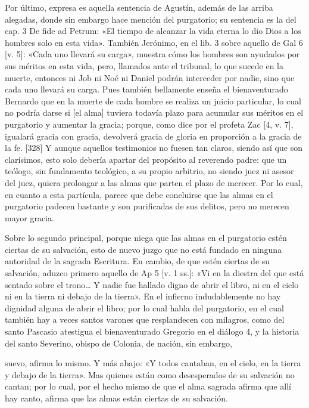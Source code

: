 Por último, expresa es aquella sentencia de Agustín, además de las arriba alegadas, donde sin embargo hace mención del purgatorio; su sentencia es la del cap. 3 De fide ad Petrum: «El tiempo de alcanzar la vida eterna lo dio Dios a los hombres solo en esta vida». También Jerónimo, en el lib. 3 sobre aquello de Gal 6 [v. 5]: «Cada uno llevará su carga», muestra cómo los hombres son ayudados por sus méritos en esta vida, pero, llamados ante el tribunal, lo que sucede en la muerte, entonces ni Job ni Noé ni Daniel podrán interceder por nadie, sino que cada uno llevará su carga. Pues también bellamente enseña el bienaventurado Bernardo que en la muerte de cada hombre se realiza un juicio particular, lo cual no podría darse si [el alma] tuviera todavía plazo para acumular sus méritos en el purgatorio y aumentar la gracia; porque, como dice por el profeta Zac [4, v. 7], igualará gracia con gracia, devolverá gracia de gloria en proporción a la gracia de la fe. [328] Y aunque aquellos testimonios no fuesen tan claros, siendo así que son clarísimos, esto solo debería apartar del propósito al reverendo padre: que un teólogo, sin fundamento teológico, a su propio arbitrio, no siendo juez ni asesor del juez, quiera prolongar a las almas que parten el plazo de merecer. Por lo cual, en cuanto a esta partícula, parece que debe concluirse que las almas en el purgatorio padecen bastante y son purificadas de sus delitos, pero no merecen mayor gracia.

Sobre lo segundo principal, porque niega que las almas en el purgatorio estén ciertas de su salvación, esto de nuevo juzgo que no está fundado en ninguna autoridad de la sagrada Escritura. En cambio, de que estén ciertas de su salvación, aduzco primero aquello de Ap 5 [v. 1 ss.]: «Vi en la diestra del que está sentado sobre el trono… Y nadie fue hallado digno de abrir el libro, ni en el cielo ni en la tierra ni debajo de la tierra». En el infierno indudablemente no hay dignidad alguna de abrir el libro; por lo cual habla del purgatorio, en el cual también hay a veces santos varones que resplandecen con milagros, como del santo Pascasio atestigua el bienaventurado Gregorio en el diálogo 4, y la historia del santo Severino, obispo de Colonia, de nación, sin embargo,

suevo, afirma lo mismo. Y más abajo: «Y todos cantaban, en el cielo, en la tierra y debajo de la tierra». Mas quienes están como desesperados de su salvación no cantan; por lo cual, por el hecho mismo de que el alma sagrada afirma que allí hay canto, afirma que las almas están ciertas de su salvación.

